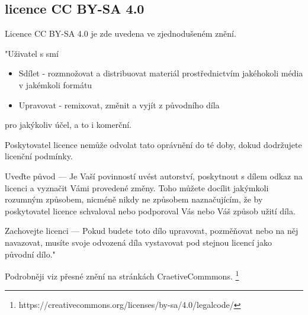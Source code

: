 \subsection{licence CC BY-SA 4.0}
\label{licence CC BY-SA 4.0}
Licence CC BY-SA 4.0 je zde uvedena ve zjednodušeném znění.

"Uživatel s smí
\begin{itemize}
    \item   Sdílet - rozmnožovat a distribuovat materiál prostřednictvím jakéhokoli média v jakémkoli formátu
    \item   Upravovat - remixovat, změnit a vyjít z původního díla
\end{itemize}
pro jakýkoliv účel, a to i komerční.

Poskytovatel licence nemůže odvolat tato oprávnění do té doby, dokud dodržujete licenční podmínky.

Uveďte původ — Je Vaší povinností uvést autorství, poskytnout s dílem odkaz na licenci a vyznačit Vámi provedené změny. Toho můžete docílit jakýmkoli rozumným způsobem, nicméně nikdy ne způsobem naznačujícím, že by poskytovatel licence schvaloval nebo podporoval Vás nebo Váš způsob užití díla.

Zachovejte licenci — Pokud budete toto dílo upravovat, pozměňovat nebo na něj navazovat, musíte svoje odvozená díla vystavovat pod stejnou licencí jako původní dílo."

Podrobněji viz přesné znění na stránkách CraetiveCommmons.
\footnote{https://creativecommons.org/licenses/by-sa/4.0/legalcode/}
